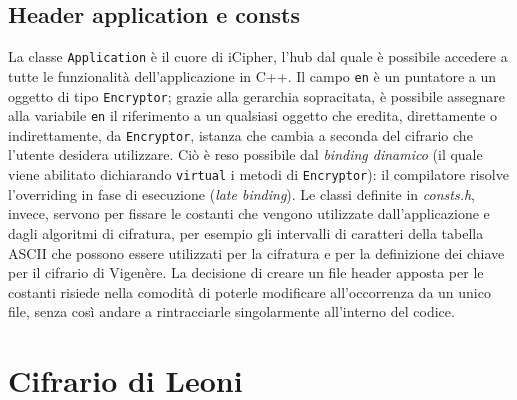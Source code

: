 \documentclass[a4paper, 12pt, one column, aas_macros]{article}
\begin{document}
	\subsection{Header application e consts}
	La classe \verb|Application| è il cuore di iCipher, l'hub dal quale è possibile accedere a tutte le funzionalità dell'applicazione in C++. Il campo \verb|en| è un puntatore a un oggetto di tipo \verb|Encryptor|; grazie alla gerarchia sopracitata, è possibile assegnare alla variabile \verb|en| il riferimento a un qualsiasi oggetto che eredita, direttamente o indirettamente, da \verb|Encryptor|, istanza che cambia a seconda del cifrario che l'utente desidera utilizzare. Ciò è reso possibile dal \textit{binding dinamico} (il quale viene abilitato dichiarando \verb|virtual| i metodi di \verb|Encryptor|): il compilatore risolve l'overriding in fase di esecuzione (\textit{late binding}). Le classi definite in \textit{consts.h}, invece, servono per fissare le costanti che vengono utilizzate dall'applicazione e dagli algoritmi di cifratura, per esempio gli intervalli di caratteri della tabella ASCII che possono essere utilizzati per la cifratura e per la definizione dei chiave per il cifrario di Vigenère. La decisione di creare un file header apposta per le costanti risiede nella comodità di poterle modificare all'occorrenza da un unico file, senza così andare a rintracciarle singolarmente all'interno del codice. 

	\section{Cifrario di Leoni}
	
\end{document}
